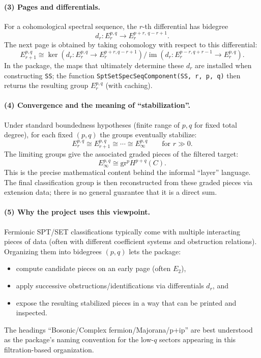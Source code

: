 \documentclass{SciPost}
\begin{document}
\paragraph{(3) Pages and differentials.}
For a cohomological spectral sequence, the $r$-th differential has bidegree
\begin{equation}
d_{r}: E_{r}^{p,q}\longrightarrow E_{r}^{p+r,\,q-r+1}. \label{eq:ss_diff}
\end{equation}
The next page is obtained by taking cohomology with respect to this differential:
\begin{equation}
E_{r+1}^{p,q} \cong \ker(d_{r}:E_{r}^{p,q}\to E_{r}^{p+r,q-r+1})\big/\operatorname{im}(d_{r}:E_{r}^{p-r,q+r-1}\to E_{r}^{p,q}).
\end{equation}
In the package, the maps that ultimately determine these $d_r$ are installed when constructing \texttt{SS}; the function \texttt{SptSetSpecSeqComponent(SS, r, p, q)} then returns the resulting group $E_r^{p,q}$ (with caching).

\paragraph{(4) Convergence and the meaning of ``stabilization''.}
Under standard boundedness hypotheses (finite range of $p,q$ for fixed total degree), for each fixed $(p,q)$ the groups eventually stabilize:
\begin{equation}
E_{r}^{p,q}\cong E_{r+1}^{p,q}\cong\cdots\cong E_{\infty}^{p,q}\qquad\text{for }r\gg 0.
\end{equation}
The limiting groups give the associated graded pieces of the filtered target:
\begin{equation}
E_{\infty}^{p,q}\cong \mathrm{gr}^{p}H^{p+q}(C).
\end{equation}
This is the precise mathematical content behind the informal ``layer'' language.
The final classification group is then reconstructed from these graded pieces via extension data; there is no general guarantee that it is a direct sum.

\paragraph{(5) Why the project uses this viewpoint.}
Fermionic SPT/SET classifications typically come with multiple interacting pieces of data (often with different coefficient systems and obstruction relations).
Organizing them into bidegrees $(p,q)$ lets the package:
\begin{itemize}
    \item compute candidate pieces on an early page (often $E_2$),
    \item apply successive obstructions/identifications via differentials $d_r$, and
    \item expose the resulting stabilized pieces in a way that can be printed and inspected.
\end{itemize}
The headings ``Bosonic/Complex fermion/Majorana/p+ip'' are best understood as the package's naming convention for the low-$q$ sectors appearing in this filtration-based organization.
\end{document}
